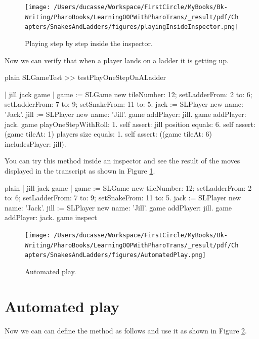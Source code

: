 \documentclass[10pt,twoside,english]{_support/latex/sbabook/sbabook}
\begin{document}
\begin{figure}

\begin{center}
\texttt{[image: /Users/ducasse/Workspace/FirstCircle/MyBooks/Bk-Writing/PharoBooks/LearningOOPWithPharoTrans/\_result/pdf/Chapters/SnakesAndLadders/figures/playingInsideInspector.png]}\caption{Playing step by step inside the inspector.\label{fig:playingInsideInspector}}\end{center}
\end{figure}


Now we can verify that when a player lands on a ladder it is getting up. 

\begin{displaycode}{plain}
SLGameTest >> testPlayOneStepOnALadder
	
	| jill jack game |
	game := SLGame new 
				tileNumber: 12; 
				setLadderFrom: 2 to: 6;
				setLadderFrom: 7 to: 9;
				setSnakeFrom: 11 to: 5.
	jack := SLPlayer new name: 'Jack'.
	jill := SLPlayer new name: 'Jill'.
	game addPlayer: jill.
	game addPlayer: jack.
	game playOneStepWithRoll: 1.
	self assert: jill position equals: 6.
	self assert: (game tileAt: 1) players size equals: 1.
	self assert: ((game tileAt: 6) includesPlayer: jill).
\end{displaycode}

You can try this method inside an inspector and see the result of the moves displayed in the transcript as shown in Figure \ref{fig:playingInsideInspector}.

\begin{displaycode}{plain}
| jill jack game |
game := SLGame new 
			tileNumber: 12; 
			setLadderFrom: 2 to: 6;
			setLadderFrom: 7 to: 9;
			setSnakeFrom: 11 to: 5.
jack := SLPlayer new name: 'Jack'.
jill := SLPlayer new name: 'Jill'.
game addPlayer: jill.
game addPlayer: jack.
game inspect
\end{displaycode}


\begin{figure}

\begin{center}
\texttt{[image: /Users/ducasse/Workspace/FirstCircle/MyBooks/Bk-Writing/PharoBooks/LearningOOPWithPharoTrans/\_result/pdf/Chapters/SnakesAndLadders/figures/AutomatedPlay.png]}\caption{Automated play.\label{fig:AutomatedPlay}}\end{center}
\end{figure}

\section{Automated play}
Now we can can define the  method as follows and use it as shown in Figure \ref{fig:AutomatedPlay}.
\end{document}
